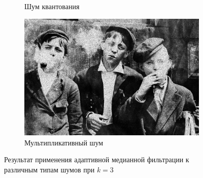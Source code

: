 \begin{figure}[ht!]
\begin{subfigure}[b]{0.5\linewidth}
    \caption{Шум квантования} 
  \end{subfigure}%
  \begin{subfigure}[b]{0.5\linewidth}
      \centering
      \includegraphics[width=0.95\linewidth]{../Adaptive_Median_Filter/Adaptive_Median_Speckle_noise_k=3.jpg} 
      \caption{Мультипликативный шум} 
  \end{subfigure} 
  \caption{Результат применения адаптивной медианной фильтрации к различным типам шумов при $k = 3$}
\end{figure}

